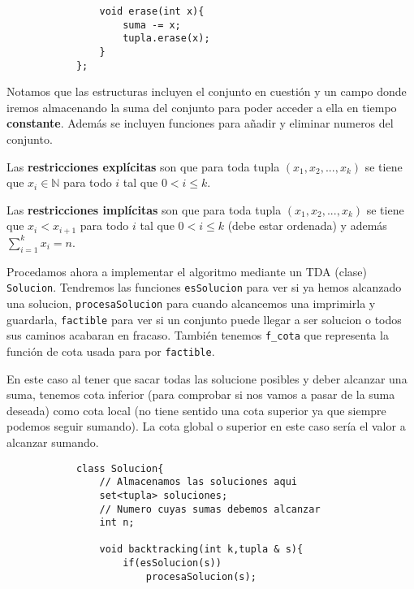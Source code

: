 \documentclass[12pt]{article}
\begin{document}
\begin{ejercicio}
\begin{lstlisting}
                void erase(int x){
                    suma -= x;
                    tupla.erase(x);
                }
            };
        \end{lstlisting}
        Notamos que las estructuras incluyen el conjunto en cuestión 
        y un campo donde iremos almacenando la suma del conjunto 
        para poder acceder a ella en tiempo \textbf{constante}.
        Además se incluyen funciones para añadir y eliminar 
        numeros del conjunto.

        Las \textbf{restricciones explícitas} son que para toda 
        tupla $(x_1,x_2,...,x_k)$ se tiene que $x_i \in \mathbb{N}$
        para todo $i$ tal que $0 < i \leq k$.

        Las \textbf{restricciones implícitas} son que para toda 
        tupla $(x_1,x_2,...,x_k)$ se tiene que $x_i < x_{i+1}$
        para todo $i$ tal que $0 < i \leq k$ (debe estar ordenada)
        y además $\sum\limits_{i=1}^{k}x_i = n$.

        Procedamos ahora a implementar el algoritmo mediante un TDA (clase) 
        \verb|Solucion|. 
        Tendremos las funciones \verb|esSolucion| para ver si ya hemos 
        alcanzado una solucion, \verb|procesaSolucion| para cuando 
        alcancemos una imprimirla y guardarla, \verb|factible| para ver 
        si un conjunto puede llegar a ser solucion o todos sus caminos 
        acabaran en fracaso. También tenemos \verb|f_cota| que 
        representa la función de cota usada para por \verb|factible|.

        En este caso al tener que sacar todas las solucione posibles 
        y deber alcanzar una suma, tenemos cota inferior 
        (para comprobar si nos vamos a pasar de la suma deseada) 
        como cota local (no tiene sentido una cota superior ya que 
        siempre podemos seguir sumando). La cota global o superior 
        en este caso sería el valor a alcanzar sumando.
        \begin{lstlisting}
            class Solucion{
                // Almacenamos las soluciones aqui
                set<tupla> soluciones; 
                // Numero cuyas sumas debemos alcanzar
                int n;

                void backtracking(int k,tupla & s){
                    if(esSolucion(s))
                        procesaSolucion(s);


\end{lstlisting}
\end{ejercicio}
\end{document}
